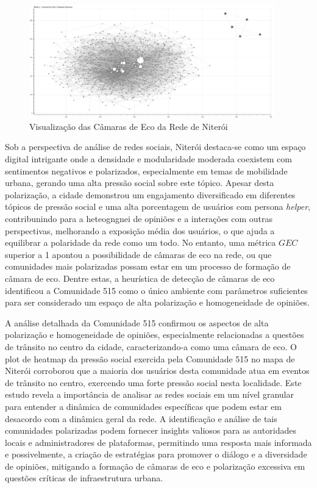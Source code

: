 \begin{figure}[htb]
	\centering
	\includegraphics[width=0.95\textwidth]{images/echo_chambers_niteroi.png}
	\caption{Visualização das Câmaras de Eco da Rede de Niterói}
	\label{fig:echo_chambers_niteroi}
\end{figure}

Sob a perspectiva de análise de redes sociais, Niterói destaca-se como um espaço digital intrigante onde a densidade e modularidade moderada coexistem com sentimentos negativos e polarizados, especialmente em temas de mobilidade urbana, gerando uma alta pressão social sobre este tópico. Apesar desta polarização, a cidade demonstrou um engajamento diversificado em diferentes tópicos de pressão social e uma alta porcentagem de usuários com persona \textit{helper}, contribunindo para a heteogngnei de opiniões e a interações com outras perspectivas, melhorando a exposição média dos usuários, o que ajuda a equilibrar a polaridade da rede como um todo. No entanto, uma métrica $GEC$ superior a 1 apontou a possibilidade de câmaras de eco na rede, ou que comunidades mais polarizadas possam estar em um processo de formação de câmara de eco. Dentre estas, a heurística de detecção de câmaras de eco identificou a Comunidade 515 como o único ambiente com parâmetros suficientes para ser considerado um espaço de alta polarização e homogeneidade de opiniões.

A análise detalhada da Comunidade 515 confirmou os aspectos de alta polarização e homogeneidade de opiniões, especialmente relacionadas a questões de trânsito no centro da cidade, caracterizando-a como uma câmara de eco. O plot de heatmap da pressão social exercida pela Comunidade 515 no mapa de Niterói corroborou que a maioria dos usuários desta comunidade atua em eventos de trânsito no centro, exercendo uma forte pressão social nesta localidade. Este estudo revela a importância de analisar as redes sociais em um nível granular para entender a dinâmica de comunidades específicas que podem estar em desacordo com a dinâmica geral da rede. A identificação e análise de tais comunidades polarizadas podem fornecer insights valiosos para as autoridades locais e administradores de plataformas, permitindo uma resposta mais informada e possivelmente, a criação de estratégias para promover o diálogo e a diversidade de opiniões, mitigando a formação de câmaras de eco e polarização excessiva em questões críticas de infraestrutura urbana.

